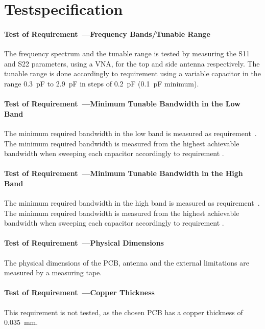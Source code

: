 \chapter{Testspecification}
\subsubsection{Test of Requirement~---Frequency Bands/Tunable Range}
The frequency spectrum and the tunable range is tested by measuring the S11 and S22 parameters, using a VNA, for the top and side antenna respectively. The tunable range is done accordingly to requirement  using a variable capacitor in the range \SI{0.3}{pF} to \SI{2.9}{pF} in steps of \SI{0.2}{pF} (\SI{0.1}{pF} minimum). 
\subsubsection{Test of Requirement~---Minimum Tunable Bandwidth in the Low Band}
The minimum required bandwidth in the low band  is measured as requirement~. The minimum required bandwidth is measured from the highest achievable bandwidth when sweeping each capacitor accordingly to requirement .

\subsubsection{Test of Requirement~---Minimum Tunable Bandwidth in the High Band}
The minimum required bandwidth in the high band is measured as requirement~. The minimum required bandwidth is measured from the highest achievable bandwidth when sweeping each capacitor accordingly to requirement .

\subsubsection{Test of Requirement~---Physical Dimensions}
The physical dimensions of the PCB, antenna and the external limitations are measured by a measuring tape. 

\subsubsection{Test of Requirement~---Copper Thickness} This requirement is not tested, as the chosen PCB has a copper thickness of \SI{0.035}{mm}.

